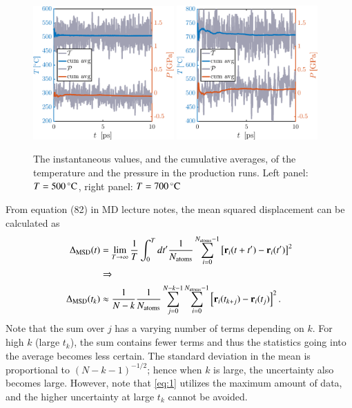 \begin{figure}[!ht]
\begin{center}
  \includegraphics[width=0.48\textwidth]{../figures/TP-prod-500} 
    \includegraphics[width=0.48\textwidth]{../figures/TP-prod-700} 
  \caption{The instantaneous values, and the cumulative averages, of the temperature and the pressure in the production runs. Left panel: $T=\unit[500]{^\circ C}$,  right panel: $T=\unit[700]{^\circ C}$}
  \label{fig:prod}
\end{center}
\end{figure}

From equation (82) in MD lecture notes, the mean squared displacement can be calculated as
\begin{align}
\Delta_{\rm MSD}(t) &= \lim_{T \rightarrow \infty} \frac{1}{T} \int_0^{T} d t' \frac{1}{N_{\rm atoms}} \sum_{i=0}^{N_{\rm atoms}-1} \left[{\bf r}_i(t+t') - {\bf r}_i(t') \right]^2 \\ &\Rightarrow \nonumber
\\
\Delta_{\rm MSD}(t_k) &\approx
\frac{1}{N -k}\frac{1}{N_{\rm atoms}} \sum_{j=0}^{N-k-1} \sum_{i=0}^{N_{\rm atoms}-1} \left[{\bf r}_i(t_{k+j}) - {\bf r}_i(t_j) \right]^2 .
\label{eq:1}
\end{align}
Note that the sum over $j$ has a varying number of terms depending on $k$. For high $k$ (large $t_k$), the sum contains fewer terms and thus the statistics going into the average becomes less certain. The standard deviation in the mean is proportional to $(N-k-1)^{-1/2}$; hence when $k$ is large, the uncertainty also becomes large. However, note that \eqref{eq:1} utilizes the maximum amount of data, and the higher uncertainty at large $t_k$ cannot be avoided.


